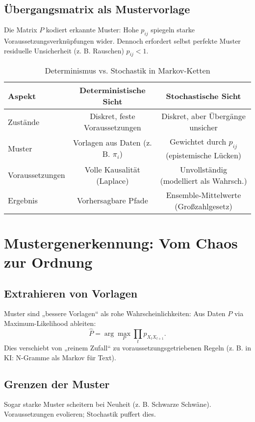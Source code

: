 \documentclass[12pt,a4paper]{article}
\begin{document}
	\subsection{Übergangsmatrix als Mustervorlage}
	Die Matrix $P$ kodiert erkannte Muster: Hohe $p_{ij}$ spiegeln starke Voraussetzungsverknüpfungen wider. Dennoch erfordert selbst perfekte Muster residuelle Unsicherheit (z. B. Rauschen) $p_{ij} < 1$.
	
	\begin{table}[h]
		\centering
		\begin{tabular}{lcc}
			\toprule
			\textbf{Aspekt} & \textbf{Deterministische Sicht} & \textbf{Stochastische Sicht} \\
			\midrule
			Zustände & Diskret, feste Voraussetzungen & Diskret, aber Übergänge unsicher \\
			Muster & Vorlagen aus Daten (z. B. $\pi_i$) & Gewichtet durch $p_{ij}$ (epistemische Lücken) \\
			Voraussetzungen & Volle Kausalität (Laplace) & Unvollständig (modelliert als Wahrsch.) \\
			Ergebnis & Vorhersagbare Pfade & Ensemble-Mittelwerte (Großzahlgesetz) \\
			\bottomrule
		\end{tabular}
		\caption{Determinismus vs. Stochastik in Markov-Ketten}
		\label{tab:comparison}
	\end{table}
	
	\section{Mustergenerkennung: Vom Chaos zur Ordnung}
	\label{sec:patterns}
	
	\subsection{Extrahieren von Vorlagen}
	Muster sind „bessere Vorlagen“ als rohe Wahrscheinlichkeiten: Aus Daten $P$ via Maximum-Likelihood ableiten:
	\begin{equation}
		\hat{P} = \arg\max_P \prod_t p_{X_t X_{t+1}}.
	\end{equation}
	Dies verschiebt von „reinem Zufall“ zu voraussetzungsgetriebenen Regeln (z. B. in KI: N-Gramme als Markov für Text).
	
	\subsection{Grenzen der Muster}
	Sogar starke Muster scheitern bei Neuheit (z. B. Schwarze Schwäne). Voraussetzungen evolieren; Stochastik puffert dies.
	
\end{document}
